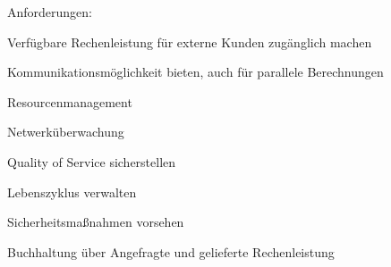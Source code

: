 \begin{notes}
    \item Anforderungen:
    \begin{notes}
        \item Verfügbare Rechenleistung für externe Kunden zugänglich machen
        \item Kommunikationsmöglichkeit bieten, auch für parallele Berechnungen
        \item Resourcenmanagement
        \item Netwerküberwachung
        \item Quality of Service sicherstellen    
        \item Lebenszyklus verwalten
        \item Sicherheitsmaßnahmen vorsehen
        \item Buchhaltung über Angefragte und gelieferte Rechenleistung


\end{notes}
\end{notes}
